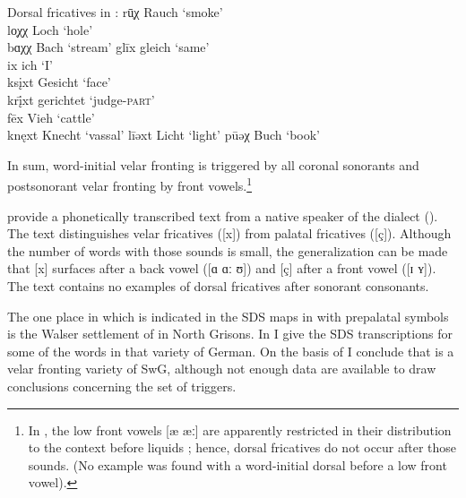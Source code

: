 \ea%
\label{ex:15:49}Dorsal fricatives in :
\ea\label{ex:15:49a} rū̜χ  \tab  [rʊːx] \tab Rauch \tab ‘smoke’ \\
    lo̜χχ \tab [lɔxx] \tab Loch \tab ‘hole’ \\
    bɑχχ \tab [bɑxx] \tab Bach \tab ‘stream’ 
\ex\label{ex:15:49b} glīx  \tab  [gliːç] \tab gleich \tab ‘same’ \\
    ix  \tab  [iç] \tab ich \tab ‘I’ \\
    ksįxt \tab [ksɪçt] \tab Gesicht \tab ‘face’ \\
    kr\={į}xt \tab [krɪːçt] \tab gerichtet \tab ‘judge-\textsc{part}’ \\
    fēx  \tab  [feːç] \tab Vieh \tab ‘cattle’ \\
    knęxt \tab [knɛçt] \tab Knecht \tab ‘vassal’ 
\ex\label{ex:15:49c} līəxt \tab [liːəçt] \tab Licht \tab ‘light’ 
\ex\label{ex:15:49d} pūəχ \tab [puːəx] \tab Buch \tab ‘book’ 
\z 
\z 

In sum,  word-initial velar fronting is triggered by all coronal sonorants and postsonorant velar fronting by front vowels.\footnote{In , the low front vowels [æ æː] are apparently restricted in their distribution to the context before liquids \citep[289]{Jutz1922}; hence, dorsal fricatives do not occur after those sounds. (No example was found with a word-initial dorsal  before a low front vowel).}

\citet{BethgeBonnin1969} provide a phonetically transcribed text from a native speaker of the  dialect (). The text distinguishes velar fricatives ([x]) from palatal fricatives ([ç]). Although the number of words with those sounds is small, the generalization can be made that [x] surfaces after a back vowel ([ɑ ɑː ʊ]) and [ç] after a front vowel ([ɪ ʏ]). The text contains no examples of dorsal fricatives after sonorant consonants.

The one place in  which is indicated in the SDS maps in  with prepalatal symbols is the Walser settlement of  in North Grisons. In  I give the SDS transcriptions for some of the words in that variety of German. On the basis of  I conclude that  is a velar fronting variety of SwG, although not enough data are available to draw conclusions concerning the set of triggers.\largerpage

